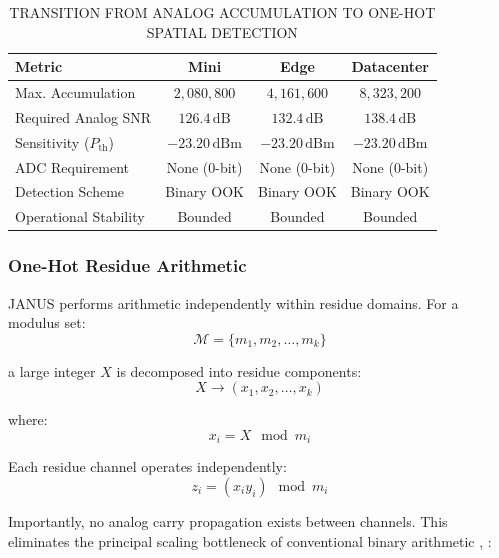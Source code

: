 \documentclass[journal]{IEEEtran}
\begin{document}
\begin{table}[htbp]
\centering
\footnotesize
\setlength{\tabcolsep}{2.5pt}
\renewcommand{\arraystretch}{1.15}
\caption{TRANSITION FROM ANALOG ACCUMULATION TO ONE-HOT SPATIAL DETECTION}
\label{tab:onehot_transition}
\begin{tabularx}{\columnwidth}{@{}Xccc@{}}
\toprule
\textbf{Metric} & \textbf{Mini} & \textbf{Edge} & \textbf{Datacenter} \\
\midrule
Max. Accumulation & $2{,}080{,}800$ & $4{,}161{,}600$ & $8{,}323{,}200$ \\
Required Analog SNR & $126.4\,\mathrm{dB}$ & $132.4\,\mathrm{dB}$ & $138.4\,\mathrm{dB}$ \\
Sensitivity ($P_{\mathrm{th}}$) & $-23.20\,\mathrm{dBm}$ & $-23.20\,\mathrm{dBm}$ & $-23.20\,\mathrm{dBm}$ \\
ADC Requirement & None (0-bit) & None (0-bit) & None (0-bit) \\
Detection Scheme & Binary OOK & Binary OOK & Binary OOK \\
Operational Stability & Bounded & Bounded & Bounded \\
\bottomrule
\end{tabularx}
\end{table}

\subsubsection{\textbf{One-Hot Residue Arithmetic}}

 JANUS performs arithmetic independently within residue domains.
For a modulus set:
\begin{equation}
\mathcal{M} = \{m_1, m_2, \dots, m_k\}
\label{eq:modulus_set}
\end{equation}

a large integer $X$ is decomposed into residue components:
\begin{equation}
X \rightarrow (x_1, x_2, \dots, x_k)
\end{equation}

where:
\begin{equation}
x_i = X \mod m_i
\label{eq:residue_projection}
\end{equation}

Each residue channel operates independently:
\begin{equation}
z_i = (x_iy_i) \mod m_i
\label{eq:modular_product}
\end{equation}

Importantly, no analog carry propagation exists between channels. This eliminates the principal scaling bottleneck of conventional binary arithmetic \cite{Omosanya2021}, \cite{Mohan2016}:
\end{document}
